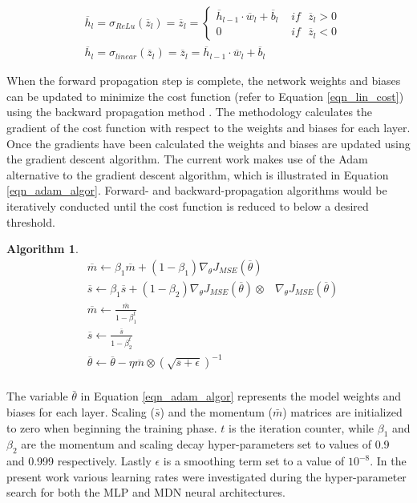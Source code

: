 \documentclass[a4paper,fleqn]{cas-sc}
\newtheorem{theorem}{Algorithm}
\begin{document}
\begin{equation}\label{eqn_act_func}
\begin{split}
&\overline{h}_l=\sigma_{ReLu}(\overline{z}_l) = \overline{z}_l =  
	\begin{cases}
	 \overline{h}_{l-1}\cdot\overline{w}_l+\overline{b}_l\,\, &if\,\,\,\, \overline{z}_l>0\\
	 0\,\, &if\,\,\,\, \overline{z}_l<0
	\end{cases}\\
&\overline{h}_l=\sigma_{linear}(\overline{z}_l) = \overline{z}_l = \overline{h}_{l-1}\cdot\overline{w}_l+\overline{b}_l
\end{split}
\end{equation}

When the forward propagation step is complete, the network weights and biases can be updated to minimize the cost function (refer to Equation \ref{eqn_lin_cost}) using the backward propagation method \cite{Rumelhart1986}. The methodology calculates the gradient of the cost function with respect to the weights and biases for each layer. Once the gradients have been calculated the weights and biases are updated using the gradient descent algorithm. The current work makes use of the Adam \cite{goodfellow} alternative to the gradient descent algorithm, which is illustrated in Equation \ref{eqn_adam_algor}. Forward- and backward-propagation algorithms would be iteratively conducted until the cost function is reduced to below a desired threshold.
\begin{theorem} 
\begin{equation}\label{eqn_adam_algor} 
\begin{split}
&\overline{m}\leftarrow \beta_1\overline{m}+(1-\beta_1)\nabla_{\theta}J_{MSE}(\overline{\theta})\\
&\overline{s}\leftarrow \beta_1\overline{s}+(1-\beta_2)\nabla_{\theta}J_{MSE}(\overline{\theta})\otimes&\nabla_{\theta}J_{MSE}(\overline{\theta})\\
&\overline{m}\leftarrow\frac{\overline{m}}{1-\beta_1^t} \\
&\overline{s}\leftarrow\frac{\overline{s}}{1-\beta_2^t}\\
&\overline{\theta}\leftarrow\overline{\theta}-\eta\overline{m}\otimes(\sqrt{\overline{s}+\epsilon})^{-1}\\
\end{split}
\end{equation}
\end{theorem}

The variable $\bar{\theta}$ in Equation \ref{eqn_adam_algor} represents the model weights and biases for each layer. Scaling ($\bar{s}$) and the momentum ($\bar{m}$) matrices are initialized to zero when beginning the training phase. $t$ is the iteration counter, while $\beta_1$ and $\beta_2$ are the momentum and scaling decay hyper-parameters set to values of 0.9 and 0.999 respectively. Lastly $\epsilon$ is a smoothing term set to a value of $10^{-8}$. In the present work various learning rates were investigated during the hyper-parameter search for both the MLP and MDN neural architectures.
\end{document}
